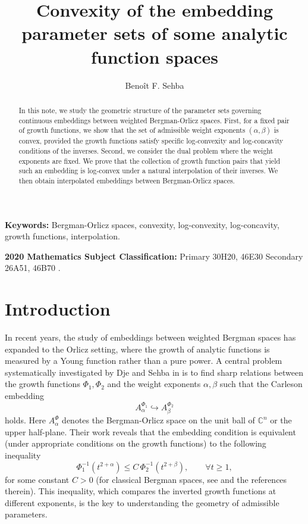 \documentclass[12pt]{amsart}
\title[Convexity of the embedding parameter sets]{Convexity of the embedding parameter sets of some analytic function spaces}
\author {Beno\^it F. Sehba}
\begin{document}
\maketitle

\begin{abstract}
In this note, we study the geometric structure of the parameter sets governing continuous embeddings between weighted Bergman-Orlicz spaces. First, for a fixed pair of growth functions, we show that the set of admissible weight exponents $(\alpha, \beta)$ is convex, provided the growth functions satisfy specific log-convexity and log-concavity conditions of the inverses. Second, we consider the dual problem where the weight exponents are fixed. We prove that the collection of growth function pairs that yield such an embedding is log-convex under a natural interpolation of their inverses. We then obtain interpolated embeddings between Bergman-Orlicz spaces. 
\end{abstract}


\noindent\textbf{Keywords:} Bergman-Orlicz spaces, convexity, log-convexity, log-concavity, growth functions, interpolation.

\noindent\textbf{2020 Mathematics Subject Classification:} Primary 30H20, 46E30 Secondary  26A51, 46B70 .



\section{Introduction}

In recent years, the study of embeddings between weighted Bergman spaces has expanded to the Orlicz setting, where the growth of analytic functions is measured by a Young function rather than a pure power. A central problem systematically investigated by Dje and Sehba in \cite{DieSehba2021,DieSehba2023,Sehba} is to find sharp relations between the growth functions $\Phi_1, \Phi_2$ and the weight exponents $\alpha, \beta$ such that the Carleson embedding
\[
A^{\Phi_1}_{\alpha} \hookrightarrow A^{\Phi_2}_{\beta}
\]
holds. Here $A^{\Phi}_{\alpha}$ denotes the Bergman-Orlicz space on the unit ball of $\mathbb{C}^n$ or the upper half-plane. Their work reveals that the embedding condition is equivalent (under appropriate conditions on the growth functions) to the following inequality 
\[
\Phi_1^{-1}\!\left( t^{2+\alpha} \right) \le C \, \Phi_2^{-1}\!\left( t^{2+\beta} \right), \qquad \forall t\ge 1,
\]
for some constant $C>0$ (for classical Bergman spaces, see \cite{HedenmalmKorenblumZhu,Luecking,Oleinik,ZhuBook,ZhuBergman} and the references therein). This inequality, which compares the inverted growth functions at different exponents, is the key to understanding the geometry of admissible parameters.
\end{document}
